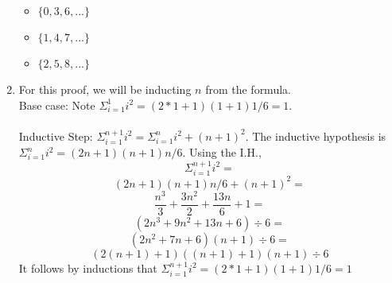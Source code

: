 \documentclass{article}
\begin{document}
\begin{enumerate}
		\begin{itemize}
			\item $\{0, 3, 6, ...\}$
			\item $\{1, 4, 7, ...\}$
			\item $\{2, 5, 8, ...\}$
		\end{itemize}
	\item
		For this proof, we will be inducting $n$ from the formula.\\
		Base case: Note $\Sigma_{i=1}^1 i^2=(2*1+1)(1+1)1/6 = 1$.\\
		\\
		Inductive Step: $\Sigma_{i=1}^{n+1} i^2 = \Sigma_{i=1}^n i^2 + (n+1)^2$.
		The inductive hypothesis is $\Sigma_{i=1}^n i^2 = (2n+1)(n+1)n/6$.	Using the I.H.,
		\[\Sigma_{i=1}^{n+1} i^2 =\]
		\[(2n+1)(n+1)n/6 + (n+1)^2 =\]
		\[\frac{n^3}{3}+\frac{3n^2}{2}+\frac{13n}{6}+1 =\]
		\[(2n^3+9n^2+13n+6)\div6=\]
		\[(2n^2+7n+6)(n+1)\div6=\]
		\[(2(n+1)+1)((n+1)+1)(n+1)\div6\]
		It follows by inductions that $\Sigma_{i=1}^{n+1} i^2=(2*1+1)(1+1)1/6 = 1$
	\end{enumerate}
\end{document}

